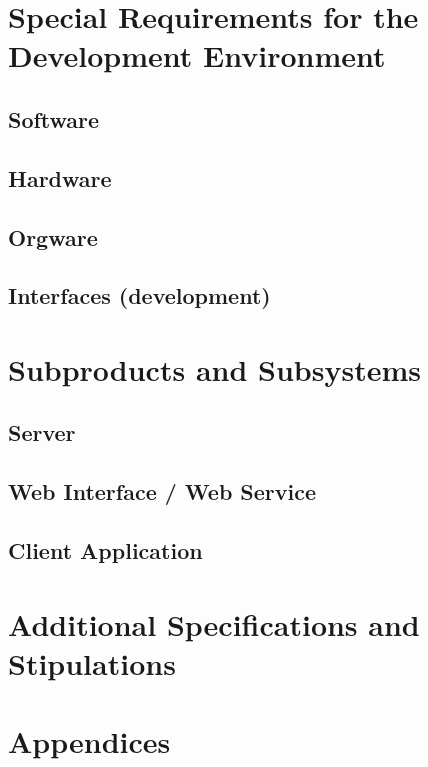 \documentclass[11pt,a4paper,oneside,svgnames]{report}
\begin{document}
\chapter{Special Requirements for the Development Environment}
\section{Software}
\section{Hardware}
\section{Orgware}
\section{Interfaces (development)}

\chapter{Subproducts and Subsystems}
\section{Server}
\section{Web Interface / Web Service}
\section{Client Application}

\chapter{Additional Specifications and Stipulations}
\chapter{Appendices}
\printglossaries
\end{document}
